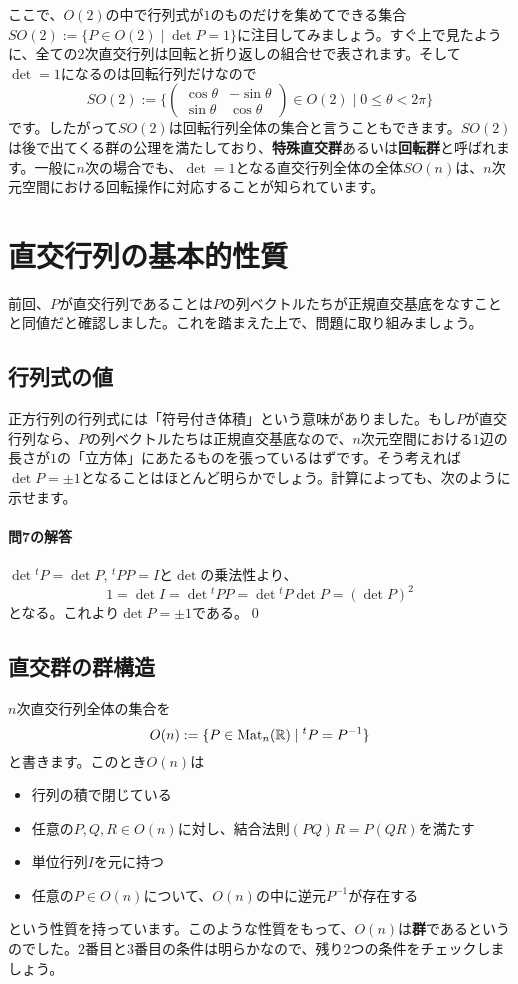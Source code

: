 ここで、$O(2)$の中で行列式が$1$のものだけを集めてできる集合$SO(2) := \{ P \in O(2) \mid \det P = 1\}$に注目してみましょう。すぐ上で見たように、全ての$2$次直交行列は回転と折り返しの組合せで表されます。そして$\det = 1$になるのは回転行列だけなので
\[
SO(2) :=
\Biggl\{
\begin{pmatrix}
\cos \theta & - \sin \theta \\
\sin \theta & \cos \theta
\end{pmatrix}
\in O(2) \mid
0 \leq \theta < 2\pi
\Biggr\}
\]
です。したがって$SO(2)$は回転行列全体の集合と言うこともできます。$SO(2)$は後で出てくる群の公理を満たしており、\textbf{特殊直交群}あるいは\textbf{回転群}と呼ばれます。一般に$n$次の場合でも、$\det = 1$となる直交行列全体の全体$SO(n)$は、$n$次元空間における回転操作に対応することが知られています。

\section{直交行列の基本的性質}

前回、$P$が直交行列であることは$P$の列ベクトルたちが正規直交基底をなすことと同値だと確認しました。これを踏まえた上で、問題に取り組みましょう。

\subsection{行列式の値}

正方行列の行列式には「符号付き体積」という意味がありました。もし$P$が直交行列なら、$P$の列ベクトルたちは正規直交基底なので、$n$次元空間における$1$辺の長さが$1$の「立方体」にあたるものを張っているはずです。そう考えれば$\det P = \pm1$となることはほとんど明らかでしょう。計算によっても、次のように示せます。

\paragraph{問7の解答} $\det {}^tP = \det P$, ${}^t P P = I$と$\det$の乗法性より、
\[
1 = \det I = \det{}^tP P = \det{}^t P \det P = (\det P)^2
\]
となる。これより$\det P = \pm1$である。\qed

\subsection{直交群の群構造}
$n$次直交行列全体の集合を
\[
O(n) := \{P \in \operatorname{Mat}_n(\mathbb{R}) \mid {}^t P = P^{-1}\}
\]
と書きます。このとき$O(n)$は
\begin{itemize}
\item 行列の積で閉じている
\item 任意の$P, Q, R \in O(n)$に対し、結合法則$(PQ)R = P(QR)$を満たす
\item 単位行列$I$を元に持つ
\item 任意の$P \in O(n)$について、$O(n)$の中に逆元$P^{-1}$が存在する
\end{itemize}
という性質を持っています。このような性質をもって、$O(n)$は\textbf{群}であるというのでした。$2$番目と$3$番目の条件は明らかなので、残り$2$つの条件をチェックしましょう。

